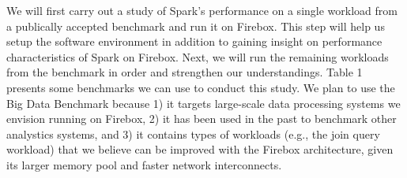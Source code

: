 \noindent

We will first carry out a study of Spark's \cite{Spark} performance on a single workload from a publically accepted benchmark and run it on Firebox.
This step will help us setup the software environment in addition to gaining insight on performance characteristics of Spark on Firebox. Next, we will run the remaining workloads from the benchmark in order and strengthen our understandings. Table 1 presents some benchmarks we can use to conduct this study. We plan to use the Big Data Benchmark because 1) it targets large-scale data processing systems we envision running on Firebox, 2) it has been used in the past to benchmark other analystics systems, and 3) it contains types of workloads (e.g., the join query workload) that we believe can be improved with the Firebox architecture, given its larger memory pool and faster network interconnects.
